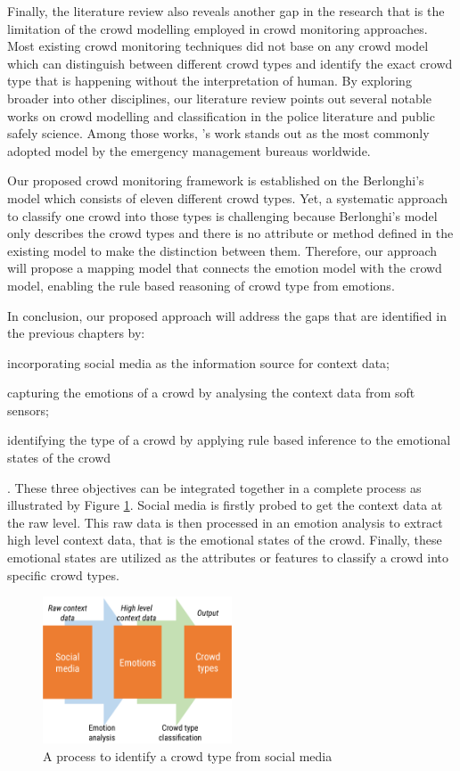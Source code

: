 Finally, the literature review also reveals another gap in the research that is the limitation of the crowd modelling employed in crowd monitoring approaches. Most existing crowd monitoring techniques did not base on any crowd model which can distinguish between different crowd types and identify the exact crowd type that is happening without the interpretation of human. By exploring broader into other disciplines, our literature review points out several notable works on crowd modelling and classification in the police literature and public safely science. Among those works, \citet{Berlonghi1995}'s work stands out as the most commonly adopted model by the emergency management bureaus worldwide. 

Our proposed crowd monitoring framework is established on the Berlonghi's model which consists of eleven different crowd types. Yet, a systematic approach to classify one crowd into those types is challenging because Berlonghi's model only describes the crowd types and there is no attribute or method defined in the existing model to make the distinction between them. Therefore, our approach will propose a mapping model that connects the emotion model with the crowd model, enabling the rule based reasoning of crowd type from emotions.

In conclusion, our proposed approach will address the gaps that are identified in the previous chapters by: 
\begin{inparaenum}[i)]
\item incorporating social media as the information source for context data;
\item capturing the emotions of a crowd by analysing the context data from soft sensors;
\item identifying the type of a crowd by applying rule based inference to the emotional states of the crowd
\end{inparaenum}. These three objectives can be integrated together in a complete process as illustrated by Figure \ref{fig:processOverview}. Social media is firstly probed to get the context data at the raw level. This raw data is then processed in an emotion analysis to extract high level context data, that is the emotional states of the crowd. Finally, these emotional states are utilized as the attributes or features to classify a crowd into specific crowd types.

\begin{figure}[htb!] 
\centering    
\includegraphics[width=0.5\textwidth]{ProcessOverview}
\caption{A process to identify a crowd type from social media}
\label{fig:processOverview}
\end{figure}

